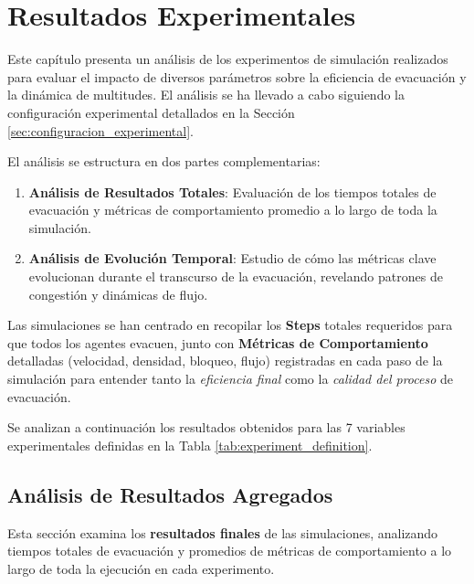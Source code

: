 \documentclass[11pt,spanish,listoffigures,listoftables]{tfgetsinf}
\begin{document}
\chapter{Resultados Experimentales}

Este capítulo presenta un análisis de los experimentos de simulación realizados para evaluar el impacto de diversos parámetros sobre la eficiencia de evacuación y la dinámica de multitudes. El análisis se ha llevado a cabo siguiendo la configuración experimental detallados en la Sección \ref{sec:configuracion_experimental}.

El análisis se estructura en dos partes complementarias:

\begin{enumerate}
    \item \textbf{Análisis de Resultados Totales}: Evaluación de los tiempos totales de evacuación y métricas de comportamiento promedio a lo largo de toda la simulación.
    \item \textbf{Análisis de Evolución Temporal}: Estudio de cómo las métricas clave evolucionan durante el transcurso de la evacuación, revelando patrones de congestión y dinámicas de flujo.
\end{enumerate}

Las simulaciones se han centrado en recopilar los \textbf{Steps} totales requeridos para que todos los agentes evacuen, junto con \textbf{Métricas de Comportamiento} detalladas (velocidad, densidad, bloqueo, flujo) registradas en cada paso de la simulación para entender tanto la \textit{eficiencia final} como la \textit{calidad del proceso} de evacuación.

Se analizan a continuación los resultados obtenidos para las 7 variables experimentales definidas en la Tabla \ref{tab:experiment_definition}.


\section{Análisis de Resultados Agregados}

Esta sección examina los \textbf{resultados finales} de las simulaciones, analizando tiempos totales de evacuación y promedios de métricas de comportamiento a lo largo de toda la ejecución en cada experimento.
\end{document}
